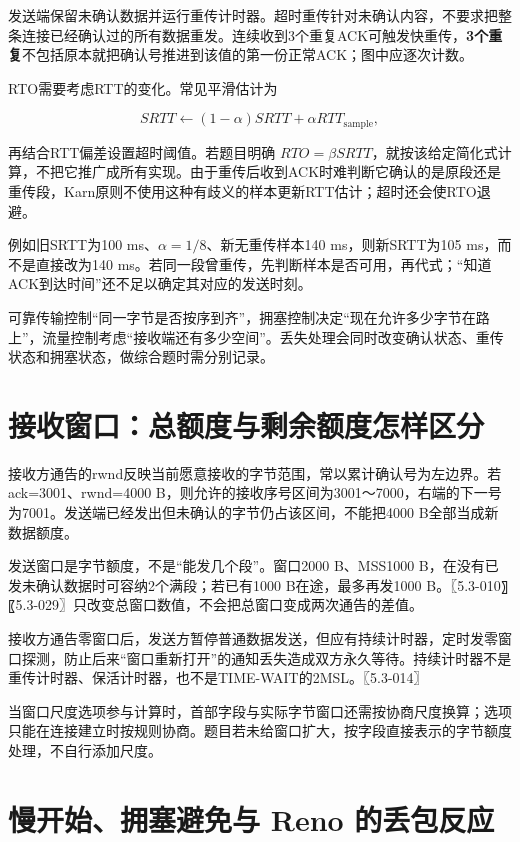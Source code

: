 发送端保留未确认数据并运行重传计时器。超时重传针对未确认内容，不要求把整条连接已经确认过的所有数据重发。连续收到3个重复ACK可触发快重传，\textbf{3个重复}不包括原本就把确认号推进到该值的第一份正常ACK；图中应逐次计数。

RTO需要考虑RTT的变化。常见平滑估计为

\[SRTT\leftarrow(1-\alpha)SRTT+\alpha RTT_{\mathrm{sample}},\]

再结合RTT偏差设置超时阈值。若题目明确 \(RTO=\beta SRTT\)，就按该给定简化式计算，不把它推广成所有实现。由于重传后收到ACK时难判断它确认的是原段还是重传段，Karn原则不使用这种有歧义的样本更新RTT估计；超时还会使RTO退避。

例如旧SRTT为100 ms、\(\alpha=1/8\)、新无重传样本140 ms，则新SRTT为105 ms，而不是直接改为140 ms。若同一段曾重传，先判断样本是否可用，再代式；``知道ACK到达时间''还不足以确定其对应的发送时刻。

可靠传输控制``同一字节是否按序到齐''，拥塞控制决定``现在允许多少字节在路上''，流量控制考虑``接收端还有多少空间''。丢失处理会同时改变确认状态、重传状态和拥塞状态，做综合题时需分别记录。

\section{接收窗口：总额度与剩余额度怎样区分}\label{cn-05-07}

接收方通告的rwnd反映当前愿意接收的字节范围，常以累计确认号为左边界。若ack=3001、rwnd=4000 B，则允许的接收序号区间为3001～7000，右端的下一号为7001。发送端已经发出但未确认的字节仍占该区间，不能把4000 B全部当成新数据额度。

发送窗口是字节额度，不是``能发几个段''。窗口2000 B、MSS1000 B，在没有已发未确认数据时可容纳2个满段；若已有1000 B在途，最多再发1000 B。〖5.3-010〗〖5.3-029〗只改变总窗口数值，不会把总窗口变成两次通告的差值。

接收方通告零窗口后，发送方暂停普通数据发送，但应有持续计时器，定时发零窗口探测，防止后来``窗口重新打开''的通知丢失造成双方永久等待。持续计时器不是重传计时器、保活计时器，也不是TIME-WAIT的2MSL。〖5.3-014〗

当窗口尺度选项参与计算时，首部字段与实际字节窗口还需按协商尺度换算；选项只能在连接建立时按规则协商。题目若未给窗口扩大，按字段直接表示的字节额度处理，不自行添加尺度。

\section{慢开始、拥塞避免与 Reno 的丢包反应}\label{cn-05-08}

